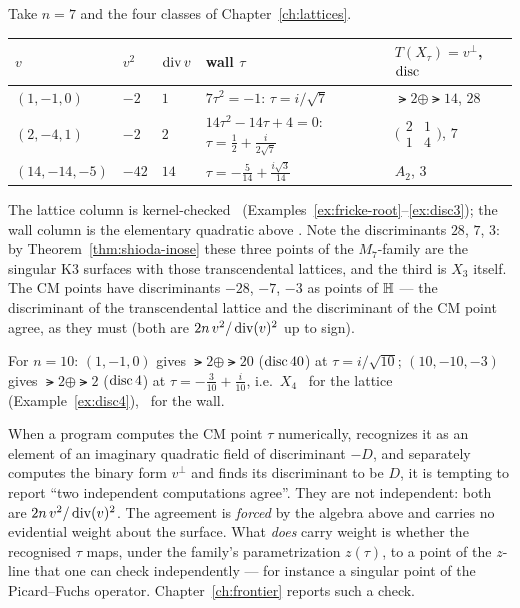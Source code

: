 \begin{example}\label{ex:walls-T7}
Take $n=7$ and the four classes of Chapter~\ref{ch:lattices}.
\begin{center}
\begin{tabular}{@{}lllll@{}}
\toprule
$v$ & $v^2$ & $\operatorname{div} v$ & wall $\tau$ & $T(X_\tau)=v^{\perp}$, $\operatorname{disc}$\\
\midrule
$(1,-1,0)$ & $-2$ & $1$ & $7\tau^2=-1$: $\tau=i/\sqrt7$ & $\lat2\oplus\lat{14}$, $28$\\
$(2,-4,1)$ & $-2$ & $2$ & $14\tau^2-14\tau+4=0$: $\tau=\tfrac12+\tfrac{i}{2\sqrt7}$ & $\bigl(\begin{smallmatrix}2&1\\1&4\end{smallmatrix}\bigr)$, $7$\\
$(14,-14,-5)$ & $-42$ & $14$ & $\tau=-\tfrac5{14}+\tfrac{i\sqrt3}{14}$ & $A_2$, $3$\\
\bottomrule
\end{tabular}
\end{center}
The lattice column is kernel-checked \Kstatus\ (Examples~\ref{ex:fricke-root}--\ref{ex:disc3});
the wall column is the elementary quadratic above \Estatus. Note the
discriminants $28$, $7$, $3$: by Theorem~\ref{thm:shioda-inose} these three
points of the $M_7$-family are the singular K3 surfaces with those
transcendental lattices, and the third is $X_3$ itself. The CM points have
discriminants $-28$, $-7$, $-3$ as points of $\mathbb{H}$ --- the discriminant of the
transcendental lattice and the discriminant of the CM point agree, as they must
(both are $2n\,v^2/\operatorname{div}(v)^2$ up to sign).
\end{example}

\begin{example}[$T_{10}$]
For $n=10$: $(1,-1,0)$ gives $\lat2\oplus\lat{20}$ ($\operatorname{disc}40$) at
$\tau=i/\sqrt{10}$; $(10,-10,-3)$ gives $\lat2\oplus\lat2$ ($\operatorname{disc}4$) at
$\tau=-\tfrac3{10}+\tfrac i{10}$, i.e.\ $X_4$ \Kstatus\ for the lattice
(Example~\ref{ex:disc4}), \Estatus\ for the wall.
\end{example}

\begin{warning}\label{warn:forced}
When a program computes the CM point $\tau$ numerically, recognizes it as an
element of an imaginary quadratic field of discriminant $-D$, and separately
computes the binary form $v^{\perp}$ and finds its discriminant to be $D$, it
is tempting to report ``two independent computations agree''. They are not
independent: both are $2n\,v^2/\operatorname{div}(v)^2$. The agreement is \emph{forced} by
the algebra above and carries no evidential weight about the surface. What
\emph{does} carry weight is whether the recognised $\tau$ maps, under the
family's parametrization $z(\tau)$, to a point of the $z$-line that one can
check independently --- for instance a singular point of the Picard--Fuchs
operator. Chapter~\ref{ch:frontier} reports such a check.
\end{warning}

